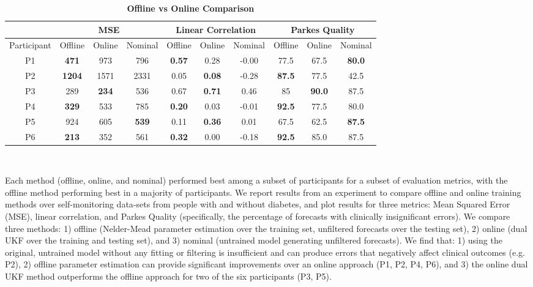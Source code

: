\documentclass[10pt,letterpaper]{article}
\begin{document}
\begin{table}[!ht]
\begin{adjustwidth}{-2.25in}{0in} %
\caption{{\bf Offline vs Online Comparison}}
\label{table:simpleOffline}
\begin{tabular}{|c|c|c|c|c|c|c|c|c|c|}
\hline
 & \multicolumn{3}{|c|}{MSE} & \multicolumn{3}{|c|}{Linear Correlation} & \multicolumn{3}{|c|}{Parkes Quality} \\
 \hline
Participant & Offline & Online & Nominal & Offline & Online & Nominal & Offline & Online & Nominal\\ 
\hline
P1 & \textbf{471} & 973 & 796 & \textbf{0.57} & 0.28 & -0.00 & 77.5 & 67.5 & \textbf{80.0}\\ \hline
P2 & \textbf{1204} & 1571 & 2331 & 0.05 & \textbf{0.08} & -0.28 & \textbf{87.5} & 77.5 & 42.5 \\ \hline
P3 & 289 & \textbf{234} & 536 & 0.67 & \textbf{0.71} & 0.46 & 85 & \textbf{90.0} & 87.5\\ \hline
P4 & \textbf{329} & 533 & 785 & \textbf{0.20} & 0.03 & -0.01 & \textbf{92.5} & 77.5 & 80.0\\ \hline
P5 & 924 & 605 & \textbf{539} & 0.11 & \textbf{0.36} & 0.01 & 67.5 & 62.5 & \textbf{87.5}\\ \hline
P6 & \textbf{213} & 352 & 561 & \textbf{0.32} & 0.00 & -0.18 & \textbf{92.5} & 85.0 & 87.5\\ \hline
\end{tabular} \\
\begin{flushleft} Each method (offline, online, and nominal) performed best among a subset of participants for a subset of evaluation metrics, with the offline method performing best in a majority of participants. We report results from an experiment to compare offline and online training methods over self-monitoring data-sets from people with and without diabetes, and plot results for three metrics: Mean Squared Error (MSE), linear correlation, and Parkes Quality (specifically, the percentage of forecasts with clinically insignificant errors). We compare three methods: 1) offline (Nelder-Mead parameter estimation over the training set, unfiltered forecasts over the testing set), 2) online (dual UKF over the training and testing set), and 3) nominal (untrained model generating unfiltered forecasts). We find that: 1) using the original, untrained model without any fitting or filtering is insufficient and can produce errors that negatively affect clinical outcomes (e.g. P2), 2) offline parameter estimation can provide significant improvements over an online approach (P1, P2, P4, P6), and 3) the online dual UKF method outperforms the offline approach for two of the six participants (P3, P5). 
\end{flushleft}
\end{adjustwidth}
\end{table}
\end{document}
